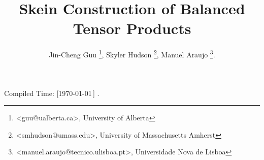 \title{Skein Construction of Balanced Tensor Products} \author{
  Jin-Cheng Guu \thanks{<guu@ualberta.ca>, University of Alberta},
  Skyler Hudson \thanks{<smhudson@umass.edu>, University of Massachusetts Amherst},
  Manuel Araujo \thanks{<manuel.araujo@tecnico.ulisboa.pt>, Universidade Nova de Lisboa}.
}
\date{}

\newcommand{\III}[9]{%
  {}^{#1}_{#2} I^{#3}_{#4}
  \left(
    \begin{matrix}
      #5 \\ {}\\ #6
    \end{matrix}
    \,\middle|\,
    \begin{matrix}
      #7 \\ #8 \\ #9
    \end{matrix}
  \right)
}
\newcommand{\II}[7]{%
  {}^{#1}_{#2} I^{#3}_{#4}
  \left( #5, #6
    \,\middle|\,
    #7
  \right)
}



\maketitle
\begin{flushright}
  \tiny{Compiled Time: [\today\,\DTMcurrenttime]} \quad\qquad.
\end{flushright}


\tableofcontents

